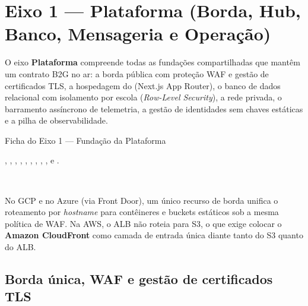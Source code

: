 \chapter{Eixo 1 --- Plataforma (Borda, Hub, Banco, Mensageria e Operação)}
\label{cap:eixo-plataforma}

O eixo \textbf{Plataforma} compreende todas as fundações compartilhadas que
mantêm um contrato B2G no ar: a borda pública com proteção WAF e gestão de
certificados TLS, a hospedagem do  (Next.js App Router), o banco
de dados relacional com isolamento por escola (\emph{Row-Level Security}), a
rede privada, o barramento assíncrono de telemetria, a gestão de identidades sem
chaves estáticas e a pilha de observabilidade.

\begin{fichaeixo}{Ficha do Eixo 1 --- Fundação da Plataforma}
\begin{campos}
  \item[Arquivos Terraform] , ,
    , , , ,
    , , , 
    e .
  \item[Aderência por nuvem] \sgcp~\nativo \quad \saws~\equivalente \quad
    \sazure~\nativo
  \item[Ponto focal] No GCP e no Azure (via Front Door), um único recurso de
    borda unifica o roteamento por \emph{hostname} para contêineres e buckets
    estáticos sob a mesma política de WAF. Na AWS, o ALB não roteia para S3, o
    que exige colocar o \textbf{Amazon CloudFront} como camada de entrada única
    diante tanto do S3 quanto do ALB.
\end{campos}
\end{fichaeixo}

\section{Borda única, WAF e gestão de certificados TLS}

